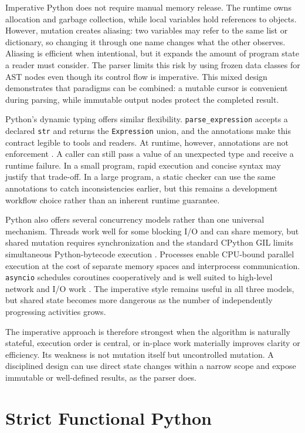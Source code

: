 \documentclass[12pt]{article}
\begin{document}
Imperative Python does not require manual memory release. The runtime owns allocation and garbage collection, while local variables hold references to objects. However, mutation creates aliasing: two variables may refer to the same list or dictionary, so changing it through one name changes what the other observes. Aliasing is efficient when intentional, but it expands the amount of program state a reader must consider. The parser limits this risk by using frozen data classes for AST nodes even though its control flow is imperative. This mixed design demonstrates that paradigms can be combined: a mutable cursor is convenient during parsing, while immutable output nodes protect the completed result.


Python's dynamic typing offers similar flexibility. \texttt{parse\_expression} accepts a declared \texttt{str} and returns the \texttt{Expression} union, and the annotations make this contract legible to tools and readers. At runtime, however, annotations are not enforcement \cite{ref4}. A caller can still pass a value of an unexpected type and receive a runtime failure. In a small program, rapid execution and concise syntax may justify that trade-off. In a large program, a static checker can use the same annotations to catch inconsistencies earlier, but this remains a development workflow choice rather than an inherent runtime guarantee.


Python also offers several concurrency models rather than one universal mechanism. Threads work well for some blocking I/O and can share memory, but shared mutation requires synchronization and the standard CPython GIL limits simultaneous Python-bytecode execution \cite{ref6}. Processes enable CPU-bound parallel execution at the cost of separate memory spaces and interprocess communication. \texttt{asyncio} schedules coroutines cooperatively and is well suited to high-level network and I/O work \cite{ref5}. The imperative style remains useful in all three models, but shared state becomes more dangerous as the number of independently progressing activities grows.


The imperative approach is therefore strongest when the algorithm is naturally stateful, execution order is central, or in-place work materially improves clarity or efficiency. Its weakness is not mutation itself but uncontrolled mutation. A disciplined design can use direct state changes within a narrow scope and expose immutable or well-defined results, as the parser does.


\section{Strict Functional Python}
\end{document}
